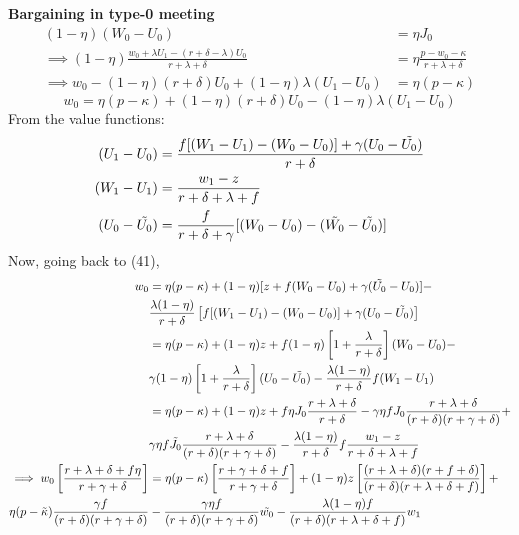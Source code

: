 \documentclass[12pt]{article} %
\theoremstyle{definition}
\begin{document}
\textbf{Bargaining in type-0 meeting}
\begin{align*}
    (1-\eta)(W_0-U_0) &= \eta J_0 
    \\
     \implies (1-\eta)\frac{w_0 + \lambda U_1 -(r+\delta-\lambda)U_0}{r+\lambda+\delta} &= \eta \frac{p-w_0-\kappa}{r+\lambda+\delta}   \\
    \implies w_0 - (1-\eta)(r+\delta) U_0 + (1-\eta)\lambda(U_1-U_0) &= \eta (p-\kappa) 
\end{align*}
\begin{equation}
    w_0 = \eta(p-\kappa)+(1-\eta)(r+\delta)U_0- (1-\eta)\lambda(U_1 - U_0) 
\end{equation}
From the value functions:
\begin{align*}
    (U_1-U_0) &= \frac{f[(W_1-U_1) -(W_0-U_0)]+\gamma(U_0-\Tilde{U_0})}{r+\delta} \\
    (W_1-U_1) &= \frac{w_1-z}{r+\delta+\lambda+f} \\
    (U_0-\Tilde{U_0}) &= \frac{f}{r+\delta+\gamma}[(W_0-U_0) -(\Tilde{W_0}-\Tilde{U_0})] \\
\end{align*}
Now, going back to (41),
\begin{align*}
     w_0 &= \eta(p-\kappa) + (1-\eta)[z + f(W_0-U_0)+\gamma(\Tilde{U_0}-U_0)] - \\ &\frac{\lambda (1-\eta)}{r+\delta}\left[f[(W_1-U_1)- (W_0-U_0)]+\gamma(U_0-\Tilde{U_0})\right] \\
     &= \eta(p-\kappa) + (1-\eta)z + f(1-\eta)\left[1+\frac{\lambda}{r+\delta}\right](W_0-U_0)- \\
     &\gamma(1-\eta)\left[1+\frac{\lambda}{r+\delta}\right]
     (U_0-\Tilde{U_0})- \frac{\lambda (1-\eta)}{r+\delta}f(W_1-U_1) \\
     &= \eta(p-\kappa) + (1-\eta)z + f\eta J_0 \frac{r+\lambda+\delta}{r+\delta}- \gamma\eta f J_0 \frac{r+\lambda+\delta}{(r+\delta)(r+\gamma+\delta)} + \\
     &\gamma\eta f\Tilde{J_0} \frac{r+\lambda+\delta}{(r+\delta)(r+\gamma+\delta)}-\frac{\lambda (1-\eta)}{r+\delta}f \frac{w_1-z}{r+\delta+\lambda+f}\\
     \implies w_0 \left[\frac{r+\lambda+\delta+f \eta}{r+\gamma+\delta}\right]
     &= \eta(p-\kappa) \left[\frac{r+\gamma+\delta+f}{r+\gamma+\delta}\right] + (1-\eta)z \left[\frac{(r+\lambda+\delta)(r+f+\delta)}{(r+\delta)(r+\lambda+\delta+f)}\right] + \\
     \eta(p-\Tilde{\kappa})\frac{\gamma f}{(r+\delta)(r+\gamma+\delta)}  &- \frac{\gamma \eta f}{(r+\delta)(r+\gamma+\delta)} \Tilde{w_0}-\frac{\lambda (1-\eta)f}{(r+\delta)(r+\lambda+\delta+f)} w_1 
\end{align*}
\end{document}
